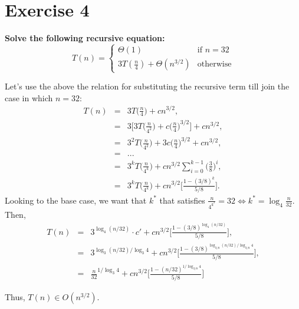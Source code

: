 \documentclass{article}
\begin{document}
	\section*{Exercise 4}
	\textbf{Solve the following recursive equation:}
	$$
	T(n) = \begin{cases}
			\Theta(1) & \text{if } n= 32 \\
			3T(\frac{n}{4}) + \Theta(n^{3/2}) & \text{otherwise}
			\end{cases} 
	$$
	
	\noindent Let's use the above the relation for substituting the recursive term till join the case in which $n=32$:
	\begin{eqnarray}
	\nonumber
	T(n) &=& 3T\Big(\frac{n}{4}\Big) + cn^{3/2}, \\
	\nonumber
	&=& 3\Bigg[ 3T\Big(\frac{n}{4^2}\Big) + c\Big(\frac{n}{4}\Big)^{3/2} \Bigg] + cn^{3/2},  \\
	\nonumber
	&=& 3^2 T\Big(\frac{n}{4^2}\Big) +3c\Big( \frac{n}{4} \Big)^{3/2} + cn^{3/2}, \\
	\nonumber
	&=& ... \\
	\nonumber
	&=& 3^{k} T\Big(\frac{n}{4^k}\Big) + cn^{3/2} \sum_{i=0}^{k-1} \Big(\frac{3}{8}\Big)^i  , \\
	\nonumber
	&=& 3^{k} T\Big(\frac{n}{4^k}\Big) + cn^{3/2}\Bigg[\frac{1-(3/8)^k}{5/8} \Bigg] .
	\end{eqnarray}
	Looking to the base case, we want that $k^*$ that satisfies $\frac{n}{4^{k^*}} = 32 \Leftrightarrow k^* = \log_4 \frac{n}{32}$.	\\
	Then, 
	\begin{eqnarray}
	\nonumber
	T(n) &=& 3^{\log_4 (n/32) } \cdot c' + cn^{3/2} \Bigg[\frac{1-(3/8)^{\log_4 (n/32)}}{5/8}\Bigg], \\
	\nonumber
	&=& 3^{\log_3 (n/32) / \log_3 4} + cn^{3/2} \Bigg[\frac{1-(3/8)^{\log_{3/8} (n/32) / \log_{3/8} 4}}{5/8}\Bigg], \\
	\nonumber
	&=&  \frac{n}{32}^{1/\log_3 4} + cn^{3/2}\Bigg[ \frac{1-(n/32)^{1 / \log_{3/8} 4}}{5/8}\Bigg]
	\end{eqnarray}
	
	Thus, $ T(n) \in O(n^{3/2}) $. 
	
\end{document}
